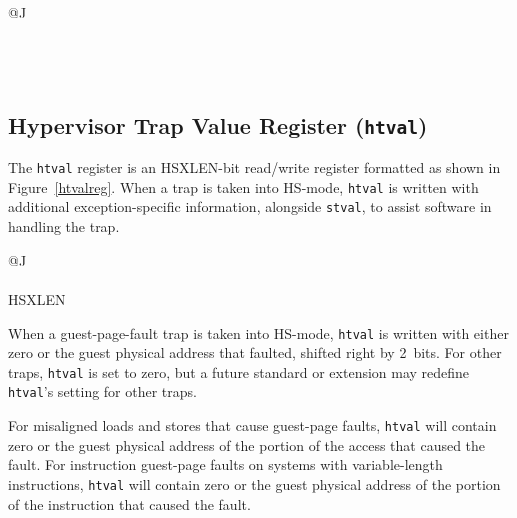 \begin{figure*}[h!]
{\footnotesize
\begin{center}
\begin{tabular}{@{}J}
 \\
\hline
{} \\
\hline
{} \\
 \\
\end{tabular}
\end{center}
}
\vspace{-0.1in}
\caption{Hypervisor time delta registers, HSXLEN=32.}
\label{hdeltahreg}
\end{figure*}

\subsection{Hypervisor Trap Value Register ({\tt htval})}

The {\tt htval} register is an HSXLEN-bit read/write register formatted
as shown in Figure~\ref{htvalreg}.
When a trap is taken into HS-mode, {\tt htval} is written with additional
exception-specific information, alongside {\tt stval}, to assist software
in handling the trap.

\begin{figure*}[h!]
{\footnotesize
\begin{center}
\begin{tabular}{@{}J}
 \\
\hline
{} \\
\hline
HSXLEN \\
\end{tabular}
\end{center}
}
\vspace{-0.1in}
\caption{Hypervisor trap value register ({\tt htval}).}
\label{htvalreg}
\end{figure*}

When a guest-page-fault trap is taken into HS-mode, {\tt htval} is
written with either zero or the guest physical address that faulted,
shifted right by 2~bits.
For other traps, {\tt htval} is set to zero, but a future standard or
extension may redefine {\tt htval}'s setting for other traps.

For misaligned loads and stores that cause guest-page faults, {\tt htval}
will contain zero or the guest physical address of the portion of the
access that caused the fault.
For instruction guest-page faults on systems with variable-length
instructions, {\tt htval} will contain zero or the guest physical address
of the portion of the instruction that caused the fault.

